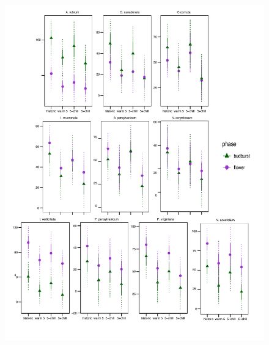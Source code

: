 \documentclass[11pt]{article}
\begin{document}
\begin{figure}[h!]
    \centering
 \includegraphics[width=\textwidth]{..//Plots/Flobuds_manuscript_figs/climpredictions.pdf}
    \caption{}
    \label{fig:preddy}
\end{figure}
\end{document}
